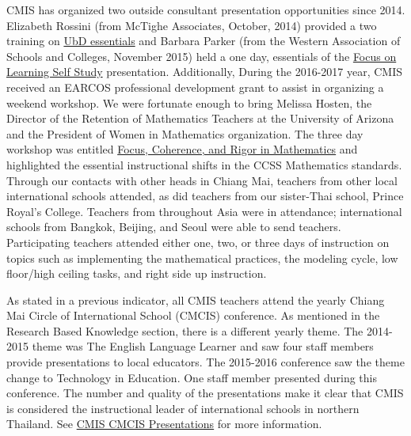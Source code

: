 \documentclass{report}
\begin{document}
\begin{findings}

CMIS has organized two outside consultant presentation opportunities since 2014. Elizabeth Rossini (from McTighe Associates, October, 2014) provided a two training on \href{https://drive.google.com/drive/folders/0ByVFfrm0zfolbDlqWjhobkhDZkk?usp=sharing}{UbD essentials} and Barbara Parker (from the Western Association of Schools and Colleges, November 2015) held a one day, essentials of the \href{https://docs.google.com/a/cmis.ac.th/document/d/1EMtUkUmaH1t4nhMe6lage73ITakAjX1REvLkAu5Yukg/edit?usp=sharing}{Focus on Learning Self Study} presentation. Additionally, During the 2016-2017 year, CMIS received an EARCOS professional development grant to assist in organizing a weekend workshop. We were fortunate enough to bring Melissa Hosten, the Director of the Retention of  Mathematics Teachers at the University of Arizona and the President of Women in Mathematics organization. The three day workshop was entitled \href{https://drive.google.com/a/cmis.ac.th/file/d/0ByVFfrm0zfolSXFEZFJVN1VOaTQ/view?usp=sharing}{Focus,  Coherence, and Rigor in Mathematics} and highlighted the essential instructional shifts in the CCSS Mathematics standards. Through our contacts with other heads in Chiang Mai, teachers from other local international schools attended, as did teachers from our sister-Thai school, Prince Royal’s College. Teachers from throughout Asia were in attendance; international schools from Bangkok, Beijing, and Seoul were able to send teachers. Participating teachers attended either one, two, or three days of instruction on topics such as implementing the mathematical practices, the modeling cycle, low floor/high ceiling tasks, and right side up instruction. 

 
As stated in a previous indicator, all  CMIS teachers attend the yearly Chiang Mai Circle of International School (CMCIS) conference.  As mentioned in the Research Based Knowledge section, there is a different yearly theme. The 2014-2015 theme was The English Language Learner and saw four staff members provide presentations to local educators. The 2015-2016 conference saw the theme change to Technology in Education. One staff member presented during this conference. The number and quality of the presentations make it clear that CMIS is considered the instructional leader of international schools in northern Thailand. See \href{https://docs.google.com/a/cmis.ac.th/document/d/19oynokmtSbfGSbxQty71a1z3-sd_QGBngaBAVtS0W90/edit?usp=sharing}{CMIS CMCIS Presentations} for more information. 


\end{findings}
\end{document}
